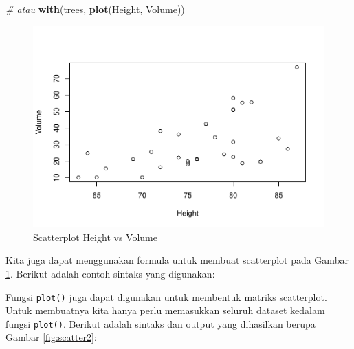 \documentclass[]{book}
\newenvironment{Shaded}{\begin{snugshade}}{\end{snugshade}}
\newcommand{\KeywordTok}[1]{\textcolor[rgb]{0.13,0.29,0.53}{\textbf{#1}}}
\newcommand{\StringTok}[1]{\textcolor[rgb]{0.31,0.60,0.02}{#1}}
\newcommand{\CommentTok}[1]{\textcolor[rgb]{0.56,0.35,0.01}{\textit{#1}}}
\newcommand{\OperatorTok}[1]{\textcolor[rgb]{0.81,0.36,0.00}{\textbf{#1}}}
\newcommand{\NormalTok}[1]{#1}
\begin{document}
\begin{Shaded}
\end{Shaded}

\begin{Shaded}
\begin{Highlighting}[]
\CommentTok{# atau }
\KeywordTok{with}\NormalTok{(trees, }\KeywordTok{plot}\NormalTok{(Height, Volume))}
\end{Highlighting}
\end{Shaded}

\begin{figure}

{\centering \includegraphics[width=0.7\linewidth]{EnvStat_files/figure-latex/scatter-1} 

}

\caption{Scatterplot Height vs Volume}\label{fig:scatter}
\end{figure}

Kita juga dapat menggunakan formula untuk membuat scatterplot pada
Gambar \ref{fig:scatter}. Berikut adalah contoh sintaks yang digunakan:

\begin{Shaded}
\end{Shaded}

Fungsi \texttt{plot()} juga dapat digunakan untuk membentuk matriks
scatterplot. Untuk membuatnya kita hanya perlu memasukkan seluruh
dataset kedalam fungsi \texttt{plot()}. Berikut adalah sintaks dan
output yang dihasilkan berupa Gambar \ref{fig:scatter2}:
\end{document}
